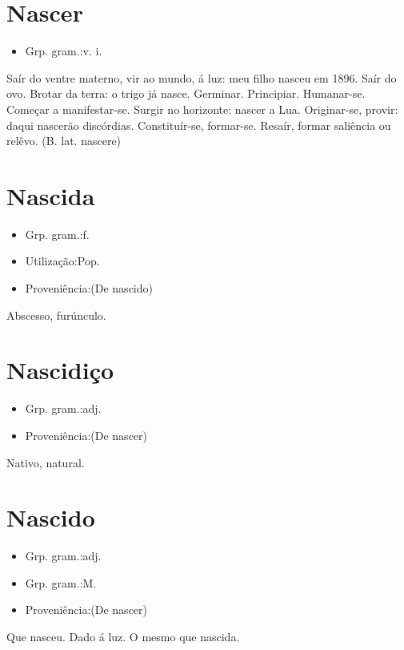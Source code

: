 \section{Nascer}
\begin{itemize}
\item {Grp. gram.:v. i.}
\end{itemize}
Saír do ventre materno, vir ao mundo, á luz: \textunderscore meu filho nasceu em 1896\textunderscore .
Saír do ovo.
Brotar da terra: \textunderscore o trigo já nasce\textunderscore .
Germinar.
Principiar.
Humanar-se.
Começar a manifestar-se.
Surgir no horizonte: \textunderscore nascer a Lua\textunderscore .
Originar-se, provir: \textunderscore daqui nascerão discórdias\textunderscore .
Constituír-se, formar-se.
Resaír, formar saliência ou relêvo.
(B. lat. \textunderscore nascere\textunderscore )
\section{Nascida}
\begin{itemize}
\item {Grp. gram.:f.}
\end{itemize}
\begin{itemize}
\item {Utilização:Pop.}
\end{itemize}
\begin{itemize}
\item {Proveniência:(De \textunderscore nascido\textunderscore )}
\end{itemize}
Abscesso, furúnculo.
\section{Nascidiço}
\begin{itemize}
\item {Grp. gram.:adj.}
\end{itemize}
\begin{itemize}
\item {Proveniência:(De \textunderscore nascer\textunderscore )}
\end{itemize}
Nativo, natural.
\section{Nascido}
\begin{itemize}
\item {Grp. gram.:adj.}
\end{itemize}
\begin{itemize}
\item {Grp. gram.:M.}
\end{itemize}
\begin{itemize}
\item {Proveniência:(De \textunderscore nascer\textunderscore )}
\end{itemize}
Que nasceu.
Dado á luz.
O mesmo que \textunderscore nascida\textunderscore .
